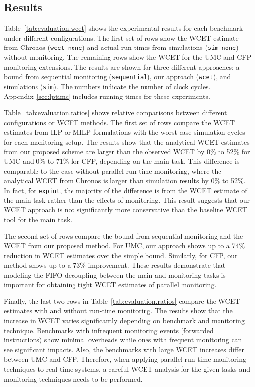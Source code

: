 \vspace{-0.05in}
\subsection{Results}

Table~\ref{tab:evaluation.wcet} shows the experimental results for each
benchmark under different configurations. The first set of rows show the WCET 
estimate from Chronos ({\tt wcet-none}) and actual run-times from simulations ({\tt sim-none}) without 
monitoring. The remaining rows show the WCET for the UMC and
CFP monitoring extensions. The results are shown for three different approaches:
a bound from sequential monitoring ({\tt sequential}), our approach ({\tt wcet}),
and simulations ({\tt sim}). The numbers indicate the number of clock cycles.
Appendix~\ref{sec:lptime} includes running times for these experiments.

Table~\ref{tab:evaluation.ratios} shows relative comparisons between
different configurations or WCET methods.
The first set of rows compare the WCET estimates from ILP or MILP formulations
with the worst-case simulation cycles for each monitoring setup. 
The results show that the analytical WCET estimates from our proposed scheme
are larger than the observed WCET by 0\% to 52\% for UMC and 0\% to 71\% for CFP, 
depending on the main task. This difference is comparable to the case without
parallel run-time monitoring, where the analytical WCET from Chronos
is larger than simulation results by 0\% to 52\%. 
In fact, for {\tt expint}, the majority of the difference is from the WCET
estimate of the main task rather than the effects of monitoring.
This result suggests that our WCET approach is not significantly more conservative than
the baseline WCET tool for the main task.

The second set of rows compare the bound from sequential monitoring and the WCET 
from our proposed method. 
For UMC, our approach shows up to a 74\% reduction in WCET estimates over the simple
bound. Similarly, for CFP, our method shows up to a 73\% improvement.
These results demonstrate that modeling the FIFO decoupling between the main and monitoring
tasks is important for obtaining tight WCET estimates of parallel
monitoring. 

Finally, the last two rows in Table~\ref{tab:evaluation.ratios} compare the WCET 
estimates with and without run-time monitoring.
The results show that the increase in WCET varies significantly depending on
benchmark and monitoring technique. Benchmarks with infrequent monitoring
events (forwarded instructions) show minimal overheads while ones with frequent
monitoring can see significant impacts.
Also, the benchmarks with large WCET increases differ between UMC and CFP.
Therefore, when applying parallel run-time monitoring techniques to real-time systems,
a careful WCET analysis for the given tasks and monitoring techniques 
needs to be performed. 


